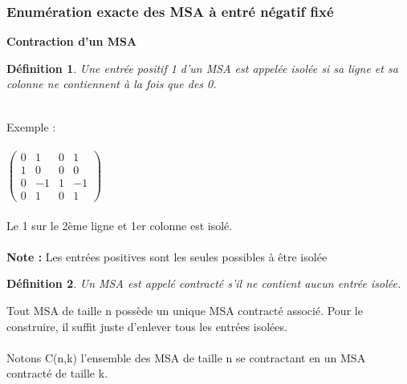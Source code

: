 \documentclass{book}
\newtheorem{petit_nom2}{Définition}[chapter]
\begin{document}
  \subsubsection{Enumération exacte des MSA à entré négatif fixé}
  \begin{large}
  \textbf{Contraction d'un MSA}
  \end{large}
  \begin{petit_nom2}
  Une entrée positif 1 d'un MSA est appelée isolée si sa ligne et sa colonne ne contiennent à la fois que des 0.
  \end{petit_nom2}
  \\ Exemple : \\\\
  $\begin{pmatrix}
 0&1&0&1\\1&0&0&0\\0&-1&1&-1\\0&1&0&1
 \end{pmatrix} $ \\\\ Le 1 sur le 2ème ligne et 1er colonne est isolé. \\\\
 \textbf{Note :} Les entrées positives sont les seules possibles à être isolée \\
 \begin{petit_nom2}
 Un MSA est appelé contracté s'il ne contient aucun entrée isolée.
 \end{petit_nom2}
 Tout MSA de taille n possède un unique MSA contracté associé. Pour le construire, il suffit juste d'enlever tous les entrées isolées. \\ \\
 Notons C(n,k) l'ensemble des MSA de taille n se contractant en un MSA contracté de taille k. \\
\end{document}
